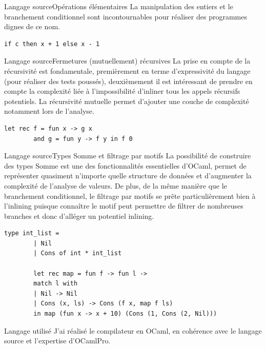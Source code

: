 \documentclass{beamer}
\begin{document}
\begin{frame}[fragile]{Langage source}{Opérations élémentaires}
    La manipulation des entiers et le branchement conditionnel sont incontournables pour réaliser des programmes dignes de ce nom.
    \begin{lstlisting}[language=caml]
        if c then x + 1 else x - 1
    \end{lstlisting}
\end{frame}

\begin{frame}[fragile]{Langage source}{Fermetures (mutuellement) récursives}
    La prise en compte de la récursivité est fondamentale, premièrement en terme d'expressivité du langage (pour réaliser des tests poussés), deuxièmement il est intéressant de prendre en compte la complexité liée à l'impossibilité d'inliner tous les appels récursifs potentiels. La récursivité mutuelle permet d'ajouter une couche de complexité notamment lors de l'analyse.
    \begin{lstlisting}[language=caml]
        let rec f = fun x -> g x
        and g = fun y -> f y in f 0
    \end{lstlisting}
\end{frame}

\begin{frame}[fragile]{Langage source}{Types Somme et filtrage par motifs}
    La possibilité de construire des types Somme est une des fonctionnalités essentielles d'OCaml, permet de représenter quasiment n'importe quelle structure de données et d'augmenter la complexité de l'analyse de valeurs. De plus, de la même manière que le branchement conditionnel, le filtrage par motifs se prête particulièrement bien à l'inlining puisque connaître le motif peut permettre de filtrer de nombreuses branches et donc d'alléger un potentiel inlining.
    \begin{lstlisting}[language=caml]
        type int_list =
        | Nil
        | Cons of int * int_list

        let rec map = fun f -> fun l ->
        match l with
        | Nil -> Nil
        | Cons (x, ls) -> Cons (f x, map f ls)
        in map (fun x -> x + 10) (Cons (1, Cons (2, Nil)))
    \end{lstlisting}
\end{frame}


\begin{frame}{Langage utilisé}
    J'ai réalisé le compilateur en OCaml, en cohérence avec le langage source et l'expertise d'OCamlPro.
\end{frame}
\end{document}
